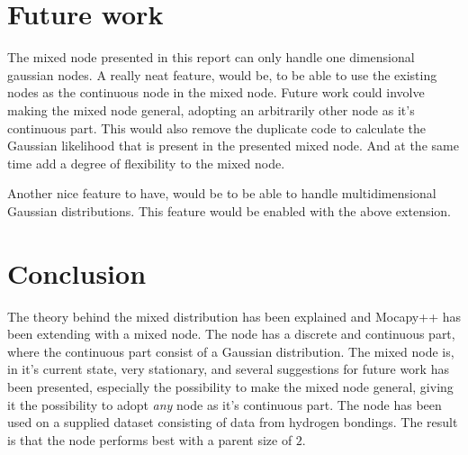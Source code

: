 \documentclass[10pt, journal, compsoc, a4paper]{IEEEtran}
\begin{document}







\section{Future work} %
\label{sec:future_work}
The mixed node presented in this report can only handle one dimensional gaussian nodes. A really neat feature, would be, to be able to use the existing nodes as the continuous node in the mixed node. Future work could involve making the mixed node general, adopting an arbitrarily other node as it's continuous part. This would also remove the duplicate code to calculate the Gaussian likelihood that is present in the presented mixed node. And at the same time add a degree of flexibility to the mixed node.

Another nice feature to have, would be to be able to handle multidimensional Gaussian distributions. This feature would be enabled with the above extension.


\section{Conclusion} %
\label{sec:conclusion}
The theory behind the mixed distribution has been explained and Mocapy++ has been extending with a mixed node. The node has a discrete and continuous part, where the continuous part consist of a Gaussian distribution. The mixed node is, in it's current state, very stationary, and several suggestions for future work has been presented, especially the possibility to make the mixed node general, giving it the possibility to adopt \emph{any} node as it's continuous part. The node has been used on a supplied dataset consisting of data from hydrogen bondings. The result is that the node performs best with a parent size of $2$. 





\end{document}
